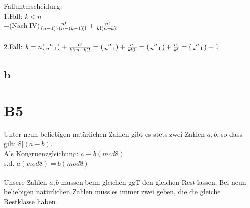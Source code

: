 \documentclass[11pt,a4paper]{article}
\begin{document}
\\ \\
Fallunterscheidung:\\
1.Fall: $k<n$\\
=(Nach IV)$ \\
\frac{n!}{(n-1)!\cdot (n-(k-1))!} + \frac{n!}{k!(n-k)!}
$
\\ \\
2.Fall: $k=n\\ (
\begin{smallmatrix}
	n\\n-1
\end{smallmatrix} ) + 
\frac{n!}{k!(n-k)!}\\ 
= (\begin{smallmatrix}
n\\n-1
\end{smallmatrix} ) + 
\frac{n!}{k!0!}\\ = (
\begin{smallmatrix}
n\\n-1
\end{smallmatrix} ) + 
\frac{n!}{k!}\\ 
= ( \begin{smallmatrix}
n\\n-1
\end{smallmatrix} ) + 1$\\

\subsection*{b}

\section*{B5}
Unter neun beliebigen natürlichen Zahlen gibt es stets zwei Zahlen $a,b$, so dass gilt: $8|(a-b)$.\\
Als Kongruenzgleichung:
$a \equiv b (mod 8)$\\
s.d. $a (mod 8) = b (mod 8)$\\ \\
Unsere Zahlen $a,b$ müssen beim gleichen ggT den gleichen Rest lassen. Bei neun beliebigen natürlichen Zahlen muss es immer zwei geben, die die gleiche Restklasse haben.
\end{document}
